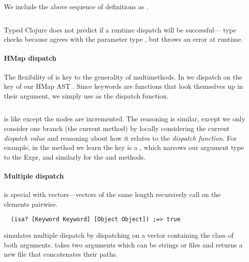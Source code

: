We include the above sequence of definitions as .

\begin{Code}
\begin{exmp}
\inputminted[firstline=5,lastline=10]{clojure}{code/demo/src/demo/rep.clj}
\label{example:rep}
\end{exmp}
\end{Code}

Typed Clojure does not predict if a runtime dispatch will be successful--- 
type checks because  agrees with the parameter type ,
but throws an error at runtime.

\paragraph{HMap dispatch} The flexibility of  is key to the generality of multimethods. 
In  we
dispatch on the  key 
of our HMap AST .
Since keywords are functions that look themselves up in their argument, we simply
use  as the dispatch function.

\begin{exmp}
\inputminted[firstline=5,lastline=18]{clojure}{code/demo/src/demo/eg5.clj}
\label{example:incmap}
\end{exmp}

 is like  except the nodes are incremented.
The reasoning is similar, except we only consider one branch (the current method) by
locally considering the current \emph{dispatch value} and reasoning about how it relates
to the \emph{dispatch function}.
For example, 
in the  method we learn the  key is a , which
narrows our argument type to the  Expr, and similarly for the 
and  methods.

\paragraph{Multiple dispatch}  is special with vectors---vectors of the
same length recursively call  on the elements pairwise.
\begin{verbatim}
  (isa? [Keyword Keyword] [Object Object]) ;=> true
\end{verbatim}

simulates multiple dispatch by dispatching on
a vector containing the class of both arguments. 
takes two arguments which can be strings or files and returns
a new file that concatenates their paths.

